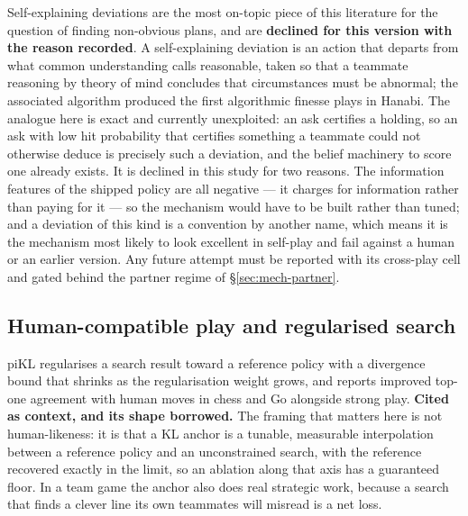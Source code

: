 Self-explaining deviations \cite{hu2022sed} are the most on-topic piece of this
literature for the question of finding non-obvious plans, and are
\textbf{declined for this version with the reason recorded}. A self-explaining
deviation is an action that departs from what common understanding calls
reasonable, taken so that a teammate reasoning by theory of mind concludes that
circumstances must be abnormal; the associated algorithm produced the first
algorithmic finesse plays in Hanabi. The analogue here is exact and currently
unexploited: an ask certifies a holding, so an ask with low hit probability that
certifies something a teammate could not otherwise deduce is precisely such a
deviation, and the belief machinery to score one already exists. It is declined
in this study for two reasons. The information features of the shipped policy
are all negative --- it charges for information rather than paying for it --- so
the mechanism would have to be built rather than tuned; and a deviation of this
kind is a convention by another name, which means it is the mechanism most
likely to look excellent in self-play and fail against a human or an earlier
version. Any future attempt must be reported with its cross-play cell and gated
behind the partner regime of \S\ref{sec:mech-partner}.

\subsection{Human-compatible play and regularised search}
\label{app:rel-human}

piKL \cite{jacob2022pikl} regularises a search result toward a reference policy
with a divergence bound that shrinks as the regularisation weight grows, and
reports improved top-one agreement with human moves in chess and Go alongside
strong play. \textbf{Cited as context, and its shape borrowed.} The framing that
matters here is not human-likeness: it is that a KL anchor is a tunable,
measurable interpolation between a reference policy and an unconstrained search,
with the reference recovered exactly in the limit, so an ablation along that
axis has a guaranteed floor. In a team game the anchor also does real strategic
work, because a search that finds a clever line its own teammates will misread
is a net loss.

